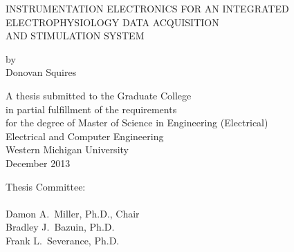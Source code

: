 \begin{singlespace}
\begin{centering}

	INSTRUMENTATION ELECTRONICS FOR AN INTEGRATED \\ ELECTROPHYSIOLOGY DATA ACQUISITION \\ AND STIMULATION SYSTEM

	
	\vspace{6\baselineskip}
	
	by\\
	\vspace{\baselineskip}
	Donovan Squires
	
	\vfill
	
	A thesis submitted to the Graduate College \\ in partial fulfillment of the requirements \\ for the degree of Master of Science in Engineering (Electrical) \\ Electrical and Computer Engineering \\ Western Michigan University \\ December 2013 
	
	\vfill
	
\end{centering}

Thesis Committee:\\ \\
\hspace*{0.5in} Damon A.~Miller, Ph.D., Chair\\
\hspace*{0.5in} Bradley J.~Bazuin, Ph.D.\\
\hspace*{0.5in} Frank L.~Severance, Ph.D.\\



\end{singlespace}

% 
